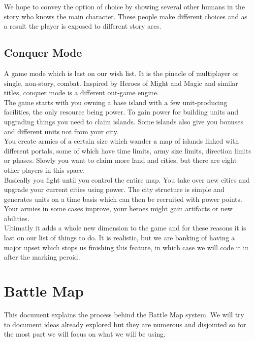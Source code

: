 \documentclass[a4paper]{article}
\begin{document}
We hope to convey the option of choice by showing several other humans in the story who knows the main character. These people make different choices and as a result the player is exposed to different story arcs.\\

\subsection{Conquer Mode}

A game mode which is last on our wish list. It is the pinacle of multiplayer or single, non-story, combat. Inspired by Heroes of Might and Magic and similar titles, conquer mode is a different out-game engine.\\

The game starts with you owning a base island with a few unit-producing facilities, the only resource being power. To gain power for building units and upgrading things you need to claim islands. Some islands also give you bonuses and different units not from your city.\\

You create armies of a certain size which wander a map of islands linked with different portals, some of which have time limits, army size limits, direction limits or phases. Slowly you want to claim more land and cities, but there are eight other players in this space.\\

Basically you fight until you control the entire map. You take over new cities and upgrade your current cities using power. The city structure is simple and generates units on a time basis which can then be recruited with power points. Your armies in some cases improve, your heroes might gain artifacts or new abilities.\\

Ultimatly it adds a whole new dimension to the game and for these reasons it is last on our list of things to do. It is realistic, but we are banking of having a major upset which stops us finishing this feature, in which case we will code it in after the marking peroid.


\newpage \section{Battle Map}

This document explains the process behind the Battle Map system. We will try to document ideas already explored but they are numerous and disjointed so for the most part we will focus on what we will be using.
\end{document}
